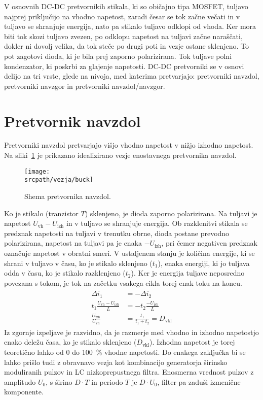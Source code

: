 \documentclass[a4paper,twoside,openright,12pt,slovene]{book}
\newcommand{\srcpath}{res_dark}
\newcommand{\srcpath}{res}
\begin{document}
V osnovnih DC-DC pretvornikih stikala, ki so običajno tipa MOSFET, tuljavo najprej priključijo na vhodno napetost,
zaradi česar se tok začne večati in v tuljavo se shranjuje energija, nato pa stikalo tuljavo odklopi od vhoda.
Ker mora biti tok skozi tuljavo zvezen, po odklopu napetost na tuljavi začne naraščati, dokler ni dovolj velika,
da tok steče po drugi poti in vezje ostane sklenjeno.
To pot zagotovi dioda, ki je bila prej zaporno polarizirana.
Tok tuljave polni kondenzator, ki poskrbi za glajenje napetosti.
DC-DC pretvorniki se v osnovi delijo na tri vrste, glede na nivoja, med katerima pretvarjajo:
pretvorniki navzdol, pretvorniki navzgor in pretvorniki navzdol/navzgor.


\section{Pretvornik navzdol} \label{sec:pretvornik_navzdol}
Pretvorniki navzdol pretvarjajo višjo vhodno napetost v nižjo izhodno napetost.
Na sliki~\ref{fig:pretvornik_navzdol} je prikazano idealizirano vezje enostavnega pretvornika navzdol.
\begin{figure}[H]
    \centering
    \texttt{[image: \\srcpath/vezja/buck]}
    \caption{\label{fig:pretvornik_navzdol} Shema pretvornika navzdol.}
\end{figure}

Ko je stikalo (tranzistor $T$) sklenjeno, je dioda zaporno polarizirana.
Na tuljavi je napetost $U_\mathrm{vh}-U_\mathrm{izh}$ in v tuljavo se shranjuje energija.
Ob razklenitvi stikala se predznak napetosti na tuljavi v trenutku obrne, dioda postane prevodno polarizirana, napetost na tuljavi pa je enaka $-U_\mathrm{izh}$, pri čemer negativen predznak označuje napetost v obratni smeri.
V ustaljenem stanju je količina energije, ki se shrani v tuljavo v času, ko je stikalo sklenjeno ($t_1$), enaka energiji, ki jo tuljava odda v času, ko je stikalo razklenjeno ($t_2$).
 Ker je energija tuljave neposredno povezana s tokom, je tok na začetku vsakega cikla torej enak toku na koncu.
\begin{align}
\begin{split}
    \Delta i_1 & = -\Delta i_2 \\
    t_1 \frac{U_\mathrm{vh}-U_\mathrm{izh}}{L} & = -t_2 \frac{-U_\mathrm{izh}}{L} \\
    \frac{U_\mathrm{izh}}{U_\mathrm{vh}} & = \frac{t_1}{t_1 + t_2} = D_\mathrm{vkl}
    \label{izp:izpeljava-pretvornik-navzdol}
\end{split}
\end{align}
Iz zgornje izpeljave je razvidno, da je razmerje med vhodno in izhodno napetostjo enako deležu časa, ko je stikalo sklenjeno ($D_\mathrm{vkl}$).
Izhodna napetost je torej teoretično lahko od 0 do 100~\% vhodne napetosti.
Do enakega zaključka bi se lahko prišlo tudi z obravnavo vezja kot kombinacijo generatorja širinsko moduliranih pulzov in LC nizkoprepustnega filtra.
Enosmerna vrednost pulzov z amplitudo $U_0$, s širino $D \cdot T$ in periodo $T$ je $D \cdot U_0$, filter pa zaduši izmenične komponente.
\end{document}
